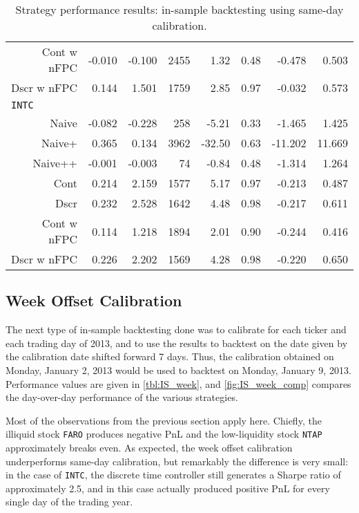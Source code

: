 \begin{table}
\begin{tabular}{@{} *{8}{r} @{}}
Cont w nFPC & -0.010 & -0.100 & 2455 & 1.32 & 0.48 & -0.478 & 0.503 \\ 
Dscr w nFPC & 0.144 & 1.501 & 1759 & 2.85 & 0.97 & -0.032 & 0.573 \\[2ex]
\multicolumn{8}{l}{\texttt{INTC}} \\
Naive & -0.082 & -0.228 & 258 & -5.21 & 0.33 & -1.465 & 1.425 \\ 
Naive+ & 0.365 & 0.134 & 3962 & -32.50 & 0.63 & -11.202 & 11.669 \\ 
Naive++ & -0.001 & -0.003 & 74 & -0.84 & 0.48 & -1.314 & 1.264 \\ 
Cont & 0.214 & 2.159 & 1577 & 5.17 & 0.97 & -0.213 & 0.487 \\ 
Dscr & 0.232 & 2.528 & 1642 & 4.48 & 0.98 & -0.217 & 0.611 \\ 
Cont w nFPC & 0.114 & 1.218 & 1894 & 2.01 & 0.90 & -0.244 & 0.416 \\ 
Dscr w nFPC &  0.226 & 2.202 & 1569 & 4.28 & 0.98 & -0.220 & 0.650 \\ 
\bottomrule
\end{tabular}
\caption{Strategy performance results: in-sample backtesting using same-day calibration.}
\label{tbl:IS_sameday}
\end{table}


\FloatBarrier
\subsection{Week Offset Calibration}
The next type of in-sample backtesting done was to calibrate for each ticker and each trading day of 2013, and to use the results to backtest on the date given by the calibration date shifted forward 7 days. Thus, the calibration obtained on Monday, January 2, 2013 would be used to backtest on Monday, January 9, 2013. Performance values are given in \autoref{tbl:IS_week}, and \autoref{fig:IS_week_comp} compares the day-over-day performance of the various strategies. 

Most of the observations from the previous section apply here. Chiefly, the illiquid stock \texttt{FARO} produces negative PnL and the low-liquidity stock \texttt{NTAP} approximately breaks even. As expected, the week offset calibration underperforms same-day calibration, but remarkably the difference is very small: in the case of \texttt{INTC}, the discrete time controller still generates a Sharpe ratio of approximately 2.5, and in this case actually produced positive PnL for every single day of the trading year. 

